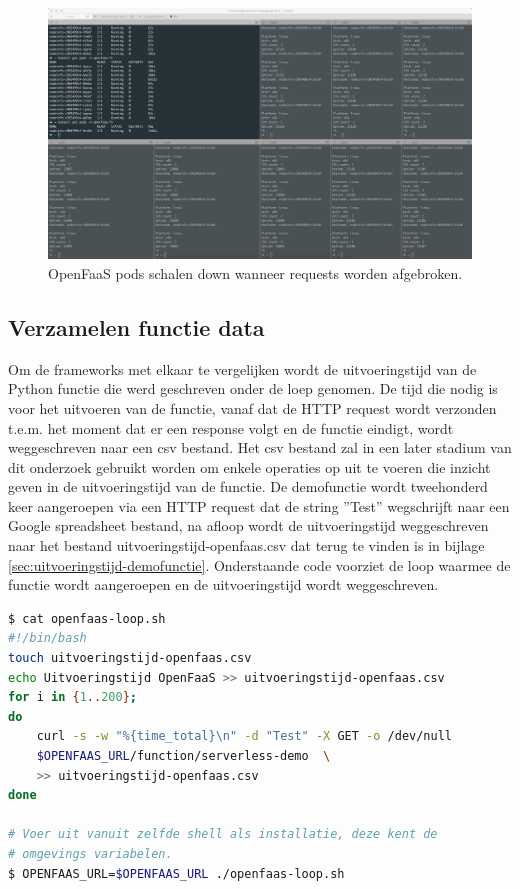 \begin{figure}
    \includegraphics[width=1\textwidth]{img/openfaas-scalability-3.png}
    \caption{OpenFaaS pods schalen down wanneer requests worden afgebroken.}
    \label{fig:openfaas-scalability-3}  
\end{figure}

\subsection{Verzamelen functie data}
Om de frameworks met elkaar te vergelijken wordt de uitvoeringstijd van de Python functie die werd geschreven onder de loep genomen. De tijd die nodig is voor het uitvoeren van de functie, vanaf dat de HTTP request wordt verzonden t.e.m. het moment dat er een response volgt en de functie eindigt, wordt weggeschreven naar een csv bestand. Het csv bestand zal in een later stadium van dit onderzoek gebruikt worden om enkele operaties op uit te voeren die inzicht geven in de uitvoeringstijd van de functie. De demofunctie wordt tweehonderd keer aangeroepen via een HTTP request dat de string ''Test'' wegschrijft naar een Google spreadsheet bestand, na afloop wordt de uitvoeringstijd weggeschreven naar het bestand uitvoeringstijd-openfaas.csv dat terug te vinden is in bijlage \ref{sec:uitvoeringstijd-demofunctie}. Onderstaande code voorziet de loop waarmee de functie wordt aangeroepen en de uitvoeringstijd wordt weggeschreven.

\begin{lstlisting}[language=bash]
$ cat openfaas-loop.sh
#!/bin/bash
touch uitvoeringstijd-openfaas.csv
echo Uitvoeringstijd OpenFaaS >> uitvoeringstijd-openfaas.csv
for i in {1..200};
do
    curl -s -w "%{time_total}\n" -d "Test" -X GET -o /dev/null
    $OPENFAAS_URL/function/serverless-demo  \
    >> uitvoeringstijd-openfaas.csv
done

# Voer uit vanuit zelfde shell als installatie, deze kent de 
# omgevings variabelen.
$ OPENFAAS_URL=$OPENFAAS_URL ./openfaas-loop.sh
\end{lstlisting}

